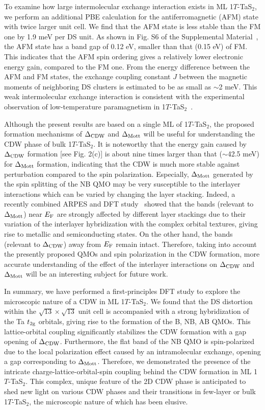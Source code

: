 \documentclass[aps,prl,twocolumn,showpacs,byrevtex]{revtex4}
\begin{document}
To examine how large intermolecular exchange interaction exists in ML 1$T$-TaS$_2$, we perform an additional PBE calculation for the antiferromagnetic (AFM) state with twice larger unit cell. We find that the AFM state is less stable than the FM one by 1.9 meV per DS unit. As shown in Fig. S6 of the Supplemental Material~\cite{SM}, the AFM state has a band gap of 0.12 eV, smaller than that (0.15 eV) of FM. This indicates that the AFM spin ordering gives a relatively lower electronic energy gain, compared to the FM one. From the energy difference between the AFM and FM states, the exchange coupling constant $J$ between the magnetic moments of neighboring DS clusters is estimated to be as small as ${\sim}$2 meV. This weak intermolecular exchange interaction is consistent with the experimental observation of low-temperature paramagnetism in 1$T$-TaS$_2$~\cite{para}.

Although the present results are based on a single ML of 1$T$-TaS$_2$, the proposed formation mechanisms of ${\Delta}_{\rm CDW}$ and ${\Delta}_{\rm Mott}$ will be useful for understanding the CDW phase of bulk 1$T$-TaS$_2$. It is noteworthy that the energy gain caused by ${\Delta}_{\rm CDW}$ formation [see Fig. 2(c)] is about nine times larger than that (${\sim}$42.5 meV) for ${\Delta}_{\rm Mott}$ formation, indicating that the CDW is much more stable against perturbation compared to the spin polarization. Especially, ${\Delta}_{\rm Mott}$ generated by the spin splitting of the NB QMO may be very susceptible to the interlayer interactions which can be varied by changing the layer stacking. Indeed, a recently combined ARPES and DFT study~\cite{Ritschel} showed that the bands (relevant to ${\Delta}_{\rm Mott}$) near $E_{\rm F}$ are strongly affected by different layer stackings due to their variation of the interlayer hybridization with the complex orbital textures, giving rise to metallic and semiconducting states. On the other hand, the bands (relevant to ${\Delta}_{\rm CDW}$) away from $E_{\rm F}$ remain intact. Therefore, taking into account the presently proposed QMOs and spin polarization in the CDW formation, more accurate understanding of the effect of the interlayer interactions on ${\Delta}_{\rm CDW}$ and ${\Delta}_{\rm Mott}$ will be an interesting subject for future work.

In summary, we have performed a first-principles DFT study to explore the microscopic nature of a CDW in ML 1$T$-TaS$_2$. We found that the DS distortion within the ${\sqrt{13}}{\times}{\sqrt{13}}$ unit cell is accompanied with a strong hybridization of the Ta $t_{\rm 2g}$ orbitals, giving rise to the formation of the B, NB, AB QMOs. This lattice-orbital coupling significantly stabilizes the CDW formation with a gap opening of ${\Delta}_{\rm CDW}$. Furthermore, the flat band of the NB QMO is spin-polarized due to the local polarization effect caused by an intramolecular exchange, opening a gap corresponding to ${\Delta}_{\rm Mott}$. Therefore, we demonstrated the presence of the intricate charge-lattice-orbital-spin coupling behind the CDW formation in ML 1$T$-TaS$_2$. This complex, unique feature of the 2D CDW phase is anticipated to shed new light on various CDW phases and their transitions in few-layer or bulk 1$T$-TaS$_2$, the microscopic nature of which has been elusive.
\end{document}
